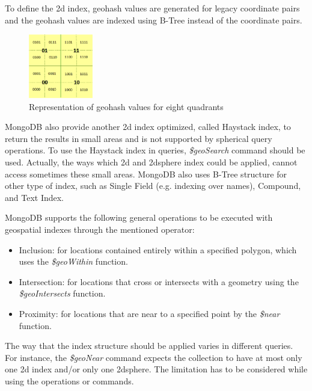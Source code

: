 \documentclass[a4paper,12pt]{article}
\begin{document}
To define the 2d index, geohash values are generated for legacy coordinate pairs and the geohash values are indexed using B-Tree instead of the coordinate pairs. 
\begin{figure}
\centering
\includegraphics[width=0.25\textwidth]{MongoIndex}
\caption{Representation of geohash values for eight quadrants}
\label{figmongoindex}
\end{figure}
MongoDB also provide another 2d index optimized, called Haystack index, to return the results in small areas and is not supported by spherical query operations. To use the Haystack index in queries, \textit{\$geoSearch} command should be used. Actually, the ways which 2d and 2dsphere index could be applied, cannot access sometimes these small areas. MongoDB also uses B-Tree structure for other type of index, such as Single Field (e.g. indexing over names), Compound, and Text Index. 

MongoDB supports the following general operations to be executed with geospatial indexes through the mentioned operator:
\begin{itemize}
\item Inclusion: for locations contained entirely within a specified polygon, which uses the \textit{\$geo\-Within} function.
\item Intersection: for locations that cross or intersects with a geometry using the
\textit{\$geo\-Intersects} function.
\item Proximity: for locations that are near to a specified point by the \textit{\$near}
function. 
\end{itemize}
The way that the index structure should be applied varies in different queries. For instance, the \textit{\$geo\-Near} command expects the collection to have at most only one 2d index and/or only one 2dsphere. The limitation has to be considered while using the operations or commands. 
\end{document}
